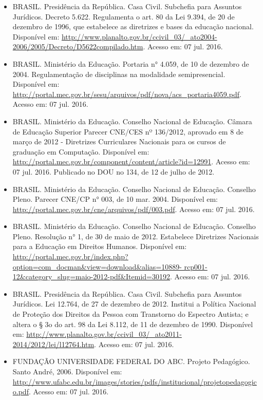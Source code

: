 \documentclass{article}
\begin{document}
\begin{itemize}
\item BRASIL. Presidência da República. Casa Civil. Subchefia para Assuntos Jurídicos. Decreto 5.622. Regulamenta o art. 80 da Lei 9.394, de 20 de dezembro de 1996, que estabelece as diretrizes e bases da educação nacional. Disponível em: \url{http://www.planalto.gov.br/ccivil_03/_ato2004-2006/2005/Decreto/D5622compilado.htm}. Acesso em: 07 jul. 2016.

\item BRASIL. Ministério da Educação. Portaria n° 4.059, de 10 de dezembro de 2004. Regulamentação de disciplinas na modalidade semipresencial. Disponível em: \url{http://portal.mec.gov.br/sesu/arquivos/pdf/nova/acs_portaria4059.pdf}. Acesso em: 07 jul. 2016.

\item BRASIL. Ministério da Educação. Conselho Nacional de Educação. Câmara de Educação Superior Parecer CNE/CES nº 136/2012, aprovado em 8 de março de 2012 - Diretrizes Curriculares Nacionais para os cursos de graduação em Computação. Disponível em: \url{http://portal.mec.gov.br/component/content/article?id=12991}. Acesso em: 07 jul. 2016. Publicado no DOU no 134, de 12 de julho de 2012.

\item BRASIL. Ministério da Educação. Conselho Nacional de Educação. Conselho Pleno. Parecer CNE/CP n° 003, de 10 mar. 2004. Disponível em:
\url{http://portal.mec.gov.br/cne/arquivos/pdf/003.pdf}. Acesso em: 07 jul. 2016.

\item BRASIL. Ministério da Educação. Conselho Nacional de Educação. Conselho Pleno. Resolução n° 1, de 30 de maio de 2012. Estabelece Diretrizes Nacionais para a Educação em Direitos Humanos. Disponível em: \url{http://portal.mec.gov.br/index.php?option=com_docman&view=download&alias=10889-
rcp001-12&category_slug=maio-2012-pdf&Itemid=30192}. Acesso em: 07 jul. 2016.

\item BRASIL. Presidência da República. Casa Civil. Subchefia para Assuntos Jurídicos. Lei 12.764, de 27 de dezembro de 2012. Institui a Política Nacional de Proteção dos Direitos da Pessoa com Transtorno do Espectro Autista; e altera o § 3o do art. 98 da Lei 8.112, de 11 de dezembro de 1990. Disponível em: \url{http://www.planalto.gov.br/ccivil_03/_ato2011-2014/2012/lei/l12764.htm}. Acesso em: 07 jul. 2016.

\item FUNDAÇÃO UNIVERSIDADE FEDERAL DO ABC. Projeto Pedagógico. Santo André,
2006. Disponível em: \url{http://www.ufabc.edu.br/images/stories/pdfs/institucional/projetopedagogico.pdf}. Acesso em: 07 jul. 2016.


\end{itemize}
\end{document}
